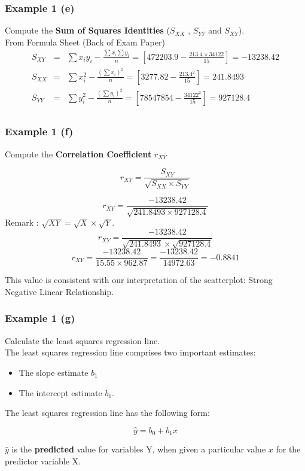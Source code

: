 \documentclass[a4]{beamer}
\begin{document}
\begin{frame}
\frametitle{Example 1 (e)}
Compute the \textbf{Sum of Squares Identities} ($S_{XX}$ , $S_{YY}$ and $S_{XY}$).\\

\bigskip
From Formula Sheet (Back of Exam Paper)
\begin{eqnarray*}
S_{XY} &=&
\sum x_iy_i - \frac{\sum x_i\sum y_i}{n} = \left[472203.9 - \frac{213.4 \times 34122}{15} \right]=  -13238.42\\
S_{XX} &=&
\sum x_i^2 - \frac{(\sum x_i)^2}{n} = \left[3277.82 - \frac{213.4^2}{15}\right] =  241.8493\\
S_{YY} &=&
\sum y_i^2 - \frac{(\sum y_i)^2}{n} = \left[78547854 - \frac{34122^2}{15}\right] = 927128.4\\
\end{eqnarray*}

\end{frame}

\begin{frame}
\frametitle{Example 1 (f)}
Compute the \textbf{Correlation Coefficient} $r_{XY}$

\[r_{XY} =  \frac{S_{XY}}{\sqrt{S_{XX} \times S_{YY}}} \]

\[r_{XY} =  \frac{-13238.42}{\sqrt{241.8493 \times 927128.4}} \]
Remark : $\sqrt{XY} = \sqrt{X} \times \sqrt{Y}$.
\[r_{XY} =  \frac{-13238.42}{\sqrt{241.8493} \times \sqrt{927128.4}} \]
\[r_{XY} =  \frac{-13238.42}{15.55 \times 962.87} = \frac{-13238.42}{14972.63} = -0.8841 \]

This value is consistent with our interpretation of the scatterplot: Strong Negative Linear Relationship.
\end{frame}

\begin{frame}
\frametitle{Example 1 (g)}
Calculate the least squares regression line.\\
\bigskip
The least squares regression line comprises two important estimates:
\begin{itemize}
\item  The slope estimate $b_1$
\item  The intercept estimate $b_0$.
\end{itemize}
The least squares regression line has the following form:

\[ \hat{y}  = b_0 + b_1x \]

$\hat{y}$ is the \textbf{predicted} value for variables Y, when given a particular value $x$ for the predictor variable X.
\end{frame}
\end{document}

